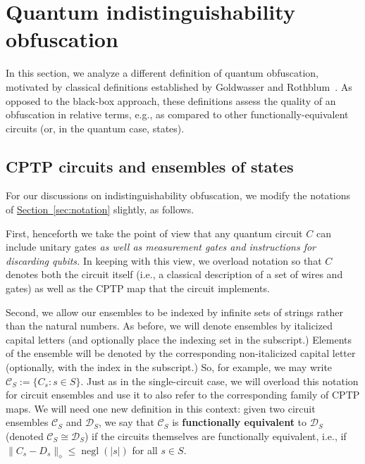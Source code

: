 \documentclass[11pt]{article}
\numberwithin{equation}{section}
\newcommand{\opn}{\operatorname}
\newcommand{\expref}[2]{\texorpdfstring{\hyperref[#2]{#1~\ref{#2}}}{#1~\ref{#2}}}
\newcommand{\negl}{\opn{negl}}
\begin{document}
{%
%
%
%


\section{Quantum indistinguishability obfuscation}\label{sec:indistinguishability}

In this section, we analyze a different definition of quantum obfuscation, motivated by classical definitions established by Goldwasser and Rothblum~\cite{GR07}. As opposed to the black-box approach, these definitions assess the quality of an obfuscation in relative terms, e.g., as compared to other functionally-equivalent circuits (or, in the quantum case, states).  

\subsection{CPTP circuits and ensembles of states}

For our discussions on indistinguishability obfuscation, we modify the notations of \expref{Section}{sec:notation} slightly, as follows. 

First, henceforth we take the point of view that any quantum circuit $C$ can include unitary gates \emph{as well as measurement gates and instructions for discarding qubits.} In keeping with this view, we overload notation so that $C$ denotes both the circuit itself (i.e., a classical description of a set of wires and gates) as well as the CPTP map that the circuit implements. 

Second, we allow our ensembles to be indexed by infinite sets of strings rather than the natural numbers. As before, we will denote ensembles by italicized capital letters (and optionally place the indexing set in the subscript.) Elements of the ensemble will be denoted by the corresponding non-italicized capital letter (optionally, with the index in the subscript.) So, for example, we may write $\mathcal C_S := \{C_s : s \in S\}$. Just as in the single-circuit case, we will overload this notation for circuit ensembles and use it to also refer to the corresponding family of CPTP maps. We will need one new definition in this context: given two circuit ensembles $\mathcal C_S$ and $\mathcal D_S$, we say that $\mathcal C_S$ is \textbf{functionally equivalent} to $\mathcal D_S$ (denoted $\mathcal C_S \cong \mathcal D_S$) if the circuits themselves are functionally equivalent, i.e., if $\|C_s - D_s\|_\diamond \leq \negl(|s|)$ for all $s \in S$. 

}
\end{document}

